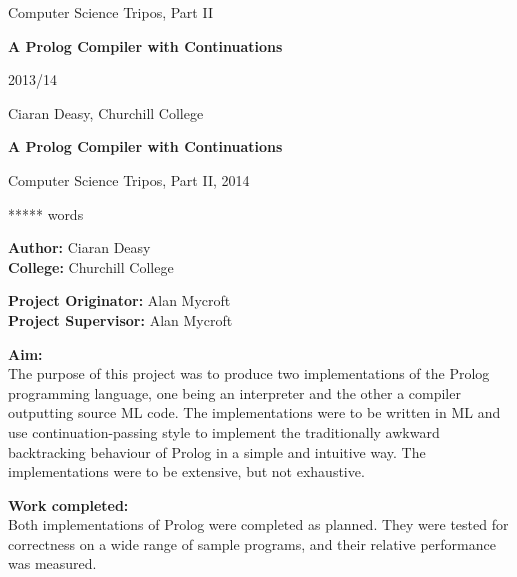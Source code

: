 \documentclass[12pt]{article}
\begin{document}
\thispagestyle{empty}

\medskip
{}
\medskip
{}

\vfil

\centerline{\large Computer Science Tripos, Part II}
\vspace{0.4in}
\centerline{\Large\bf A Prolog Compiler with Continuations}
\vspace{0.3in}
\centerline{\large 2013/14}
\vspace{2.5in}

\newpage
\hspace{5px}
\newpage

\vfil

\centerline{\large Ciaran Deasy, Churchill College}
\vspace{0.4in}
\centerline{\Large\bf A Prolog Compiler with Continuations}
\vspace{0.3in}
\centerline{\large Computer Science Tripos, Part II, 2014}
\vspace{0.1in}
\centerline{ ***** words}
\vspace{0.25in}

{\bf Author:} Ciaran Deasy\\
{\bf College:} Churchill College

\vspace{0.25in}

{\bf Project Originator:} Alan Mycroft\\
{\bf Project Supervisor:} Alan Mycroft

\vspace{0.25in}

{\bf Aim:}\\
The purpose of this project was to produce two implementations of the Prolog programming language, one being an interpreter and the other a compiler outputting source ML code. The implementations were to be written in ML and use continuation-passing style to implement the traditionally awkward backtracking behaviour of Prolog in a simple and intuitive way. The implementations were to be extensive, but not exhaustive. 

\vspace{0.25in}

{\bf Work completed:}\\
Both implementations of Prolog were completed as planned. They were tested for correctness on a wide range of sample programs, and their relative performance was measured.
\end{document}
